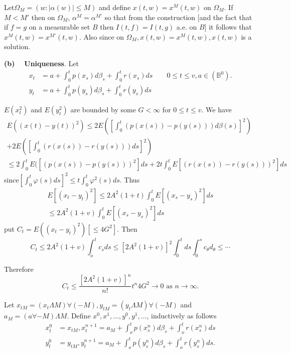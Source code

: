 Let\pageoriginale $\Omega_M = (w : |\alpha (w) | \leq M)$ and define
$x (t, w) = x^M 
(t, w)$ on $\Omega_M$. If $M< M'$ then on $\Omega_M$, $\alpha^M =
\alpha^{M'}$ so that from the construction [and the fact that if $f =g$
  on a measurable set $B$ then $I (t, f) =I (t, g)$ a.e. on $B$] it
follows that $x^M (t, w) = x^{M'} (t, w)$. Also since on $\Omega_M, x
(t, w) = x^M (t, w), x (t, w)$ is a solution.  

\textbf{(b) ~ Uniqueness}. Let
\begin{align*}
  x_t & = a + \int^t_0 p (x_s) d \beta_s + \int^t_0 r (x_s) ds \qquad
  0 \leq t \leq v, a \in (\mathbb{B}^0). \\ 
  y_t & = a + \int^t_0 p (y_s) d \beta_s  + \int^t_0 r (y_s) ds
\end{align*}

\setcounter{case}{0}
\begin{case}%
 $E (x^2_t)$ and $E(y^2_t)$ are bounded by some $G < \infty$ for $0
  \leq t \leq v$. We have 
  \begin{multline*}
    E((x(t) -y(t))^2) \leq 2E \left(\left[ \int^t_0 (p(x(s)) -p (y(s))) d
      \beta (s)\right]^2 \right)\\ 
    + 2E \left(\left[ \int^t_0 (r(x(s)) -r (y(s)))
      ds\right]^2 \right) \\ 
    \leq 2 \int^t_0 E (\left[(p(x(s)) -p (y(s)))^2\right] ds + 2 t
    \int^t_0 E \left[(r(x(s))-r (y(s)))^2\right]ds  
\end{multline*}
since\quad $\left[\int^t_0 \varphi (s) ds \right]^2 \leq t \int^t_0
  \varphi^2 (s) ds$. Thus 
  \begin{multline*}
    E \left[ (x_t -y_t)^2\right] \leq 2A^2 (1 + t) \int^t_0 E \left[
      (x_s - y_s)^2\right]ds\\ 
    \leq 2A^2 (1+v) \int^t_0 E \left[ (x_s - y_s)^2\right] ds 
\end{multline*}
put \quad $C_t = E ((x_t - y_t)^2) \left[ \leq 4 G^2 \right]$. Then
$$
C_t \leq 2A^2 (1+v) \int^t_o c_s ds \leq \left[ 2A^2 (1+v)\right]^2
\int^t_0 ds \int^s_0 c_\theta d_\theta \leq \cdots 
$$
\end{case}

Therefore
$$
C_t \leq \frac{[2A^2 (1+v)]^n}{n!} t^n 4 G^2 \rightarrow 0\text{\ as\ } n
\rightarrow \infty. 
$$\pageoriginale

\begin{case}%
Let $x_{tM}= (x_t \Lambda M) \forall (-M), y_{tM} = (y_t \Lambda M)
  \forall (-M) $ and $a_M=(a \forall -M)\Lambda M$. Define $x^0, x^1,
  \ldots , y^0, y^1, \ldots$, inductively as follows  
\begin{align*}
 x^0_t &= x_{tM}, x^{n+1}_t = a_M + \int^t_o p(x^n_s) d \beta_s +
    \int^t_o r (x^n_s)ds\\ 
y^0_t &= y_{tM}, y^{n+1}_t = a_M + \int^t_o p(y^n_s) d \beta_s +
    \int^t_o r(y^n_s) ds. 
  \end{align*} 
\end{case}

